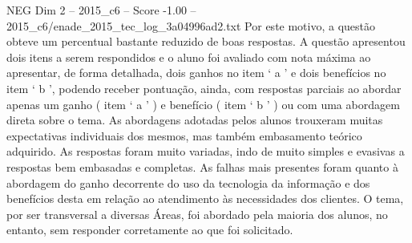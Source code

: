 \begin{textsample}{NEG Dim 2 – 2015\_c6 – Score -1.00 – 2015\_c6/enade\_2015\_tec\_log\_3a04996ad2.txt}
Por este motivo, a questão obteve um percentual bastante reduzido de boas respostas.
A questão apresentou dois itens a serem respondidos e o aluno foi avaliado com nota máxima ao apresentar, de forma detalhada, dois ganhos no item ‘ a ’ e dois benefícios no item ‘ b ’, podendo receber pontuação, ainda, com respostas parciais ao abordar apenas um ganho ( item ‘ a ’ ) e benefício ( item ‘ b ’ ) ou com uma abordagem direta sobre o tema.
As abordagens adotadas pelos alunos trouxeram muitas expectativas individuais dos mesmos, mas também embasamento teórico adquirido.
As respostas foram muito variadas, indo de muito simples e evasivas a respostas bem embasadas e completas.
As falhas mais presentes foram quanto à abordagem do ganho decorrente do uso da tecnologia da informação e dos benefícios desta em relação ao atendimento às necessidades dos clientes.
O tema, por ser transversal a diversas Áreas, foi abordado pela maioria dos alunos, no entanto, sem responder corretamente ao que foi solicitado.

\end{textsample}
